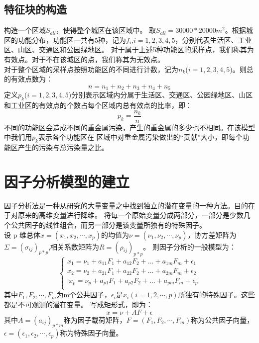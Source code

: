 \documentclass[a4paper]{article}
\begin{document}
\subsection{特征块的构造}
构造一个区域$S_{all}$，使得整个城区在该区域中。
取$S_{all}=30000*20000m^2$。根据城区的功能分布，功能区一共有5种，记为$f_i$,$i=1,2,3,4,5$，分别代表生活区、工业区、山区、交通区和公园绿地区。
对于属于上述5种功能区的采样点，我们称其为有效点。对于不在该城区的点，我们称其为无效点。\\
\indent 对于整个区域的采样点按照功能区的不同进行计数，记为$n_k$($i=1,2,3,4,5$)。则总的有效点数为：
\begin{equation}
n=n_1+n_2+n_3+n_4+n_5
\end{equation}
\indent 定义$p_k$($i=1,2,3,4,5$)分别表示区域内分属于生活区、交通区、公园绿地区、山区和工业区的有效点的个数占每个区域内总有效点的比率，即：
\begin{equation}
p_k=\frac{n_k}{n}
\end{equation}
不同的功能区会造成不同的重金属污染，产生的重金属的多少也不相同。在该模型中我们用$p_k$表示各个功能区在
区域中对重金属污染做出的“贡献”大小，即每个功能区产生的污染与总污染量之比。
\section{因子分析模型的建立}
因子分析法是一种从研究的大量变量之中找到独立的潜在变量的一种方法。目的在于对原来的高维变量进行降维。
将每一个原始变量分成两部分，一部分是少数几个公共因子的线性组合，而另一部分是该变量所独有的特殊因子。 \\
\indent 设 p 维总体$x=(x_1,x_2,\cdots,x_p)$的均值为$\nu=(\nu_1,\nu_2,\cdots,\nu_p)$，协方差矩阵为$\Sigma=(\sigma_{ij})_{p*p}$,相关系数矩阵为$R=(\rho_{ij})_{p*p}$。
则因子分析的一般模型为：
\begin{equation}
\left\{
\begin{aligned}
x_1=\nu_1+a_{11}F_1+a_{12}F_2+\dots+a_{1m}F_m+\epsilon_1    \\
x_2=\nu_2+a_{21}F_1+a_{22}F_2+\dots+a_{2m}F_m+\epsilon_2    \\
\vdots
x_p=\nu_p+a_{p1}F_1+a_{p2}F_2+\dots+a_{pm}F_m+\epsilon_p    \\
\end{aligned}
\right.
\end{equation}
其中$F_1,F_2,\cdots,F_m$为m个公共因子，$\epsilon_i$是$x_i(i=1,2,\cdots,p)$所独有的特殊因子。这些都是不可观测的潜在变量。
写成矩形式，即为：
\begin{equation}
x=\nu+AF+\epsilon
\end{equation}
其中$A=(a_{ij})_{p*m}$称为因子载荷矩阵，$F=(F_1,F_2,\cdots,F_m)$称为公共因子向量，$\epsilon=(\epsilon_1,\epsilon_2,\cdots,\epsilon_p)$称为特殊因子向量。
\end{document}
